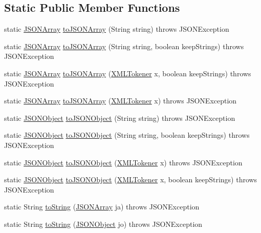 \subsection*{Static Public Member Functions}
\begin{DoxyCompactItemize}
\item 
static \hyperlink{classorg_1_1json_1_1JSONArray}{J\-S\-O\-N\-Array} \hyperlink{classorg_1_1json_1_1JSONML_a97e622e1f610e21ba5cbd3167d4fb5a1}{to\-J\-S\-O\-N\-Array} (String string)  throws J\-S\-O\-N\-Exception 
\item 
static \hyperlink{classorg_1_1json_1_1JSONArray}{J\-S\-O\-N\-Array} \hyperlink{classorg_1_1json_1_1JSONML_abbd02d23e1a31f67521b5c43adfff065}{to\-J\-S\-O\-N\-Array} (String string, boolean keep\-Strings)  throws J\-S\-O\-N\-Exception 
\item 
static \hyperlink{classorg_1_1json_1_1JSONArray}{J\-S\-O\-N\-Array} \hyperlink{classorg_1_1json_1_1JSONML_a5c079d243049461cc42fa0911af5ded5}{to\-J\-S\-O\-N\-Array} (\hyperlink{classorg_1_1json_1_1XMLTokener}{X\-M\-L\-Tokener} x, boolean keep\-Strings)  throws J\-S\-O\-N\-Exception 
\item 
static \hyperlink{classorg_1_1json_1_1JSONArray}{J\-S\-O\-N\-Array} \hyperlink{classorg_1_1json_1_1JSONML_a82cc8221f4feee054e12a5689a2186f4}{to\-J\-S\-O\-N\-Array} (\hyperlink{classorg_1_1json_1_1XMLTokener}{X\-M\-L\-Tokener} x)  throws J\-S\-O\-N\-Exception 
\item 
static \hyperlink{classorg_1_1json_1_1JSONObject}{J\-S\-O\-N\-Object} \hyperlink{classorg_1_1json_1_1JSONML_aa517a2c5f1930ae22619425098e55f41}{to\-J\-S\-O\-N\-Object} (String string)  throws J\-S\-O\-N\-Exception 
\item 
static \hyperlink{classorg_1_1json_1_1JSONObject}{J\-S\-O\-N\-Object} \hyperlink{classorg_1_1json_1_1JSONML_a5e4cd4993b426b1d03b640769b7df135}{to\-J\-S\-O\-N\-Object} (String string, boolean keep\-Strings)  throws J\-S\-O\-N\-Exception 
\item 
static \hyperlink{classorg_1_1json_1_1JSONObject}{J\-S\-O\-N\-Object} \hyperlink{classorg_1_1json_1_1JSONML_a9075449699e2ebca8721a6bdf04ee35f}{to\-J\-S\-O\-N\-Object} (\hyperlink{classorg_1_1json_1_1XMLTokener}{X\-M\-L\-Tokener} x)  throws J\-S\-O\-N\-Exception 
\item 
static \hyperlink{classorg_1_1json_1_1JSONObject}{J\-S\-O\-N\-Object} \hyperlink{classorg_1_1json_1_1JSONML_a79a799675cf7c900eea8596efef305e3}{to\-J\-S\-O\-N\-Object} (\hyperlink{classorg_1_1json_1_1XMLTokener}{X\-M\-L\-Tokener} x, boolean keep\-Strings)  throws J\-S\-O\-N\-Exception 
\item 
static String \hyperlink{classorg_1_1json_1_1JSONML_aeb4921c45210936fbcd3a527e1df88fd}{to\-String} (\hyperlink{classorg_1_1json_1_1JSONArray}{J\-S\-O\-N\-Array} ja)  throws J\-S\-O\-N\-Exception 
\item 
static String \hyperlink{classorg_1_1json_1_1JSONML_aa436f0b8577f68314e12f23f803437c2}{to\-String} (\hyperlink{classorg_1_1json_1_1JSONObject}{J\-S\-O\-N\-Object} jo)  throws J\-S\-O\-N\-Exception 
\end{DoxyCompactItemize}


